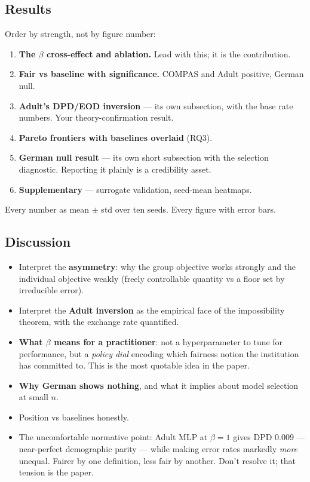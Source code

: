 \subsection{Results}
Order by strength, not by figure number:
\begin{enumerate}
\item \textbf{The $\beta$ cross-effect and ablation.} Lead with this; it is the
contribution.
\item \textbf{Fair vs baseline with significance.} COMPAS and Adult positive,
German null.
\item \textbf{Adult's DPD/EOD inversion} --- its own subsection, with the base
rate numbers. Your theory-confirmation result.
\item \textbf{Pareto frontiers with baselines overlaid} (RQ3).
\item \textbf{German null result} --- its own short subsection with the
selection diagnostic. Reporting it plainly is a credibility asset.
\item \textbf{Supplementary} --- surrogate validation, seed-mean heatmaps.
\end{enumerate}
Every number as mean $\pm$ std over ten seeds. Every figure with error bars.

\subsection{Discussion}
\begin{itemize}
\item Interpret the \textbf{asymmetry}: why the group objective works strongly
and the individual objective weakly (freely controllable quantity vs a floor set
by irreducible error).
\item Interpret the \textbf{Adult inversion} as the empirical face of the
impossibility theorem, with the exchange rate quantified.
\item \textbf{What $\beta$ means for a practitioner}: not a hyperparameter to
tune for performance, but a \emph{policy dial} encoding which fairness notion the
institution has committed to. This is the most quotable idea in the paper.
\item \textbf{Why German shows nothing}, and what it implies about model
selection at small $n$.
\item Position vs baselines honestly.
\item The uncomfortable normative point: Adult MLP at $\beta=1$ gives DPD
$0.009$ --- near-perfect demographic parity --- while making error rates markedly
\emph{more} unequal. Fairer by one definition, less fair by another. Don't
resolve it; that tension is the paper.
\end{itemize}

